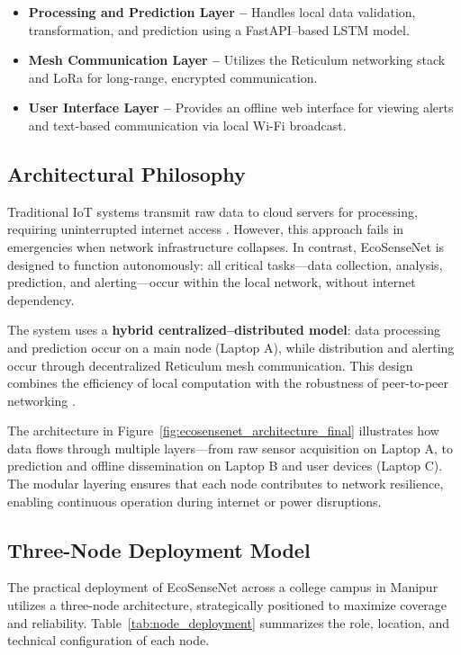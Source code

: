 \begin{itemize}
    \item \textbf{Processing and Prediction Layer –} Handles local data validation, transformation, and prediction using a FastAPI–based LSTM model.
    \item \textbf{Mesh Communication Layer –} Utilizes the Reticulum networking stack and LoRa for long-range, encrypted communication.
    \item \textbf{User Interface Layer –} Provides an offline web interface for viewing alerts and text-based communication via local Wi-Fi broadcast.
\end{itemize}

\subsection{Architectural Philosophy}

Traditional IoT systems transmit raw data to cloud servers for processing, requiring uninterrupted internet access \cite{gubbi2013internet}. However, this approach fails in emergencies when network infrastructure collapses. In contrast, EcoSenseNet is designed to function autonomously: all critical tasks—data collection, analysis, prediction, and alerting—occur within the local network, without internet dependency.

The system uses a \textbf{hybrid centralized–distributed model}: data processing and prediction occur on a main node (Laptop A), while distribution and alerting occur through decentralized Reticulum mesh communication. This design combines the efficiency of local computation with the robustness of peer-to-peer networking \cite{akyildiz2005wireless}.


The architecture in Figure~\ref{fig:ecosensenet_architecture_final} illustrates how data flows through multiple layers—from raw sensor acquisition on Laptop A, to prediction and offline dissemination on Laptop B and user devices (Laptop C). The modular layering ensures that each node contributes to network resilience, enabling continuous operation during internet or power disruptions.

\subsection{Three-Node Deployment Model}

The practical deployment of EcoSenseNet across a college campus in Manipur utilizes a three-node architecture, strategically positioned to maximize coverage and reliability. Table~\ref{tab:node_deployment} summarizes the role, location, and technical configuration of each node.

